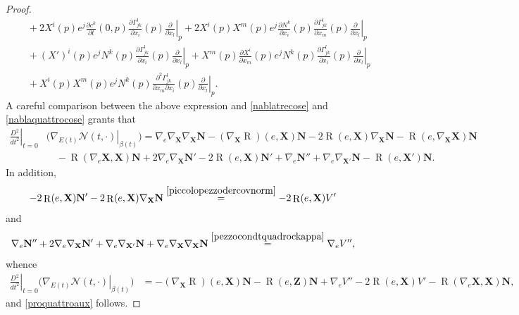 \documentclass[11pt]{amsart}
\newcommand{\n}[1]{\nabla^\varepsilon_{ #1 }}
\newcommand{\N}{\mathcal N}
\newcommand{\X}{\mathbf{X}}
\newcommand{\Z}{\mathbf{Z}}
\renewcommand{\n}{\mathbf{N}}
\DeclareMathOperator{\R}{R}
\theoremstyle{definition}
\theoremstyle{remark}
\numberwithin{equation}{section}
\begin{document}
\begin{proof}
\begin{equation*}
\begin{split}
             &\quad +2X^i(p) e^j\frac{\partial c^k}{\partial t}(0,p)\frac{\partial \Gamma_{jk}^l}{\partial x_i}(p)\left.\frac{\partial}{\partial x_l}\right|_{p}+2X^i(p)X^m(p)e^j\frac{\partial N^k}{\partial x_i}(p)\frac{\partial \Gamma_{jk}^l}{\partial x_m}(p)\left.\frac{\partial}{\partial x_l}\right|_{p}\\
            &\quad+(X')^i(p)e^jN^k(p)\frac{\partial\Gamma_{jk}^l}{\partial x_i}(p)\left.\frac{\partial}{\partial x_l}\right|_{p}+X^m(p)\frac{\partial X^i}{\partial x_m}(p)e^jN^k(p)\frac{\partial\Gamma_{jk}^l}{\partial x_i}(p)\left.\frac{\partial}{\partial x_l}\right|_{p}\\
            &\quad+X^i(p)X^m(p)e^jN^k(p)\frac{\partial^2\Gamma_{jk}^l}{\partial x_m\partial x_i}(p)\left.\frac{\partial}{\partial x_l}\right|_{p}.
        \end{split}
    \end{equation*}
    A careful comparison between the above expression and \eqref{nablatrecose} and \eqref{nablaquattrocose} grants that
    \begin{equation*}
        \begin{split}
            \left.\frac{D^2}{dt^2}\right|_{t=0}&\Big(\left.\nabla_{E(t)}\N(t,\cdot)\right|_{\beta(t)}\Big)=\nabla _e\nabla_\X\nabla_\X \n-\left(\nabla_\X \R\right)(e,\X)\n-2 \R(e,\X)\nabla_\X \n-\R\left(e,\nabla_\X \X\right)\n\\
            &\quad-\R\left(\nabla_e\X,\X\right)\n+2\nabla_e\nabla_\X\n'-2\R(e,\X)\n'+\nabla_e \n''+\nabla_e\nabla_{\X'}\n-\R(e,\X')\n.
        \end{split}
    \end{equation*}
    In addition,
    \begin{equation*}
        -2 \R(e,\X)\n'-2\R(e,\X)\nabla_\X \n\overset{\eqref{piccolopezzodercovnorm}}{=}-2\R(e,\X)V'
    \end{equation*}
    and 
    \begin{equation*}
        \nabla_e \n''+2\nabla_e\nabla_\X \n'+\nabla_e \nabla_{\X'}\n+\nabla_e\nabla_\X\nabla_\X \n\overset{\eqref{pezzocondtquadrockappa}}{=}\nabla_e V'',
    \end{equation*}
    whence
  \begin{equation*}
        \begin{split}
            \left.\frac{D^2}{dt^2}\right|_{t=0}\Big(\left.\nabla_{E(t)}\N(t,\cdot)\right|_{\beta(t)}\Big)&=-\left(\nabla_\X \R\right)(e,\X)\n-\R\left(e,\Z\right)\n+\nabla_e V''-2\R(e,\X)V'-\R\left(\nabla_e\X,\X\right)\n,
        \end{split}
    \end{equation*}
    and \eqref{proquattroaux} follows.
\end{proof}
\end{document}

